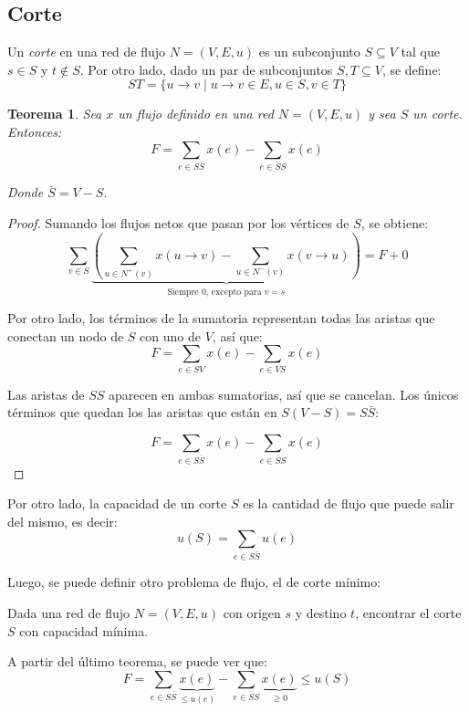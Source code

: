 \documentclass[a4paper]{report}
\newtheorem*{theorem*}{Teorema}
\begin{document}
\subsection{Corte}

Un \textit{corte} en una red de flujo $N = (V, E, u)$ es un subconjunto $S \subseteq V$ tal que $s \in S$ y $t \notin S$. Por otro lado, dado un par de subconjuntos $S, T \subseteq V$, se define:
    $$ST = \{u \rightarrow v \mid u \rightarrow v \in E, u \in S, v \in T\}$$

\begin{theorem*}
    \leavevmode

    Sea $x$ un flujo definido en una red $N = (V, E, u)$ y sea $S$ un corte. Entonces:
    $$F = \sum_{e \in S\bar{S}} x(e) - \sum_{e \in \bar{S}S} x(e)$$

    Donde $\bar{S} = V - S$.
\end{theorem*}
\begin{proof}
    Sumando los flujos netos que pasan por los vértices de $S$, se obtiene:
    $$\sum_{v \in S}\underbrace{\left(\sum_{u \in N^+(v)} x(u \rightarrow v) - \sum_{u \in N^-(v)} x(v \rightarrow u)\right)}_{\text{Siempre $0$, excepto para $v = s$}} = F + 0$$

    Por otro lado, los términos de la sumatoria representan todas las aristas que conectan un nodo de $S$ con uno de $V$, así que:
    $$F = \sum_{e \in SV} x(e) - \sum_{e \in VS} x(e)$$

    Las aristas de $SS$ aparecen en ambas sumatorias, así que se cancelan. Los únicos términos que quedan los las aristas que están en $S(V - S) = S\bar{S}$:

    $$F = \sum_{e \in S\bar{S}} x(e) - \sum_{e \in \bar{S}S} x(e)$$

\end{proof}

Por otro lado, la capacidad de un corte $S$ es la cantidad de flujo que puede salir del mismo, es decir:
$$u(S) = \sum_{e \in S\bar{S}} u(e)$$

Luego, se puede definir otro problema de flujo, el de corte mínimo:

\begin{problema}
    Dada una red de flujo $N = (V, E, u)$ con origen $s$ y destino $t$, encontrar el corte $S$ con capacidad mínima.
\end{problema}

A partir del último teorema, se puede ver que:
    $$F = \sum_{e \in S\bar{S}} \underbrace{x(e)}_{\leq u(e)} - \sum_{e \in \bar{S}S} \underbrace{x(e)}_{\geq 0} \leq u(S)$$
\end{document}
